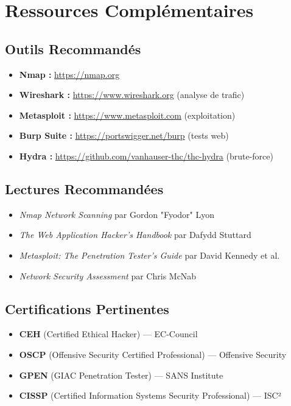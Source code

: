 \documentclass[12pt,a4paper,openany]{report}
\begin{document}
	\section{Ressources Complémentaires}
	
	\subsection{Outils Recommandés}
	\begin{itemize}
		\item \textbf{Nmap :} \url{https://nmap.org}
		\item \textbf{Wireshark :} \url{https://www.wireshark.org} (analyse de trafic)
		\item \textbf{Metasploit :} \url{https://www.metasploit.com} (exploitation)
		\item \textbf{Burp Suite :} \url{https://portswigger.net/burp} (tests web)
		\item \textbf{Hydra :} \url{https://github.com/vanhauser-thc/thc-hydra} (brute-force)
	\end{itemize}
	
	\subsection{Lectures Recommandées}
	\begin{itemize}
		\item \textit{Nmap Network Scanning} par Gordon "Fyodor" Lyon
		\item \textit{The Web Application Hacker's Handbook} par Dafydd Stuttard
		\item \textit{Metasploit: The Penetration Tester's Guide} par David Kennedy et al.
		\item \textit{Network Security Assessment} par Chris McNab
	\end{itemize}
	
	\subsection{Certifications Pertinentes}
	\begin{itemize}
		\item \textbf{CEH} (Certified Ethical Hacker) --- EC-Council
		\item \textbf{OSCP} (Offensive Security Certified Professional) --- Offensive Security
		\item \textbf{GPEN} (GIAC Penetration Tester) --- SANS Institute
		\item \textbf{CISSP} (Certified Information Systems Security Professional) --- ISC²
	\end{itemize}
	
	
\end{document}
